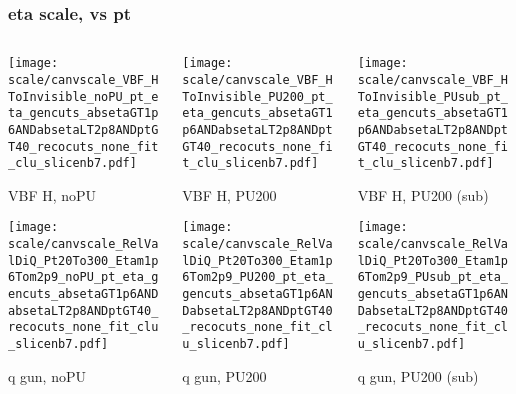 \documentclass[8pt]{beamer}
\begin{document}
  \begin{frame}
  \frametitle{eta scale, vs pt}
  
  \begin{columns}
   \begin{column}{0.35\textwidth}
     \texttt{[image: scale/canvscale\_VBF\_HToInvisible\_noPU\_pt\_eta\_gencuts\_absetaGT1p6ANDabsetaLT2p8ANDptGT40\_recocuts\_none\_fit\_clu\_slicenb7.pdf]}
     
     VBF H, noPU
    
     \texttt{[image: scale/canvscale\_RelValDiQ\_Pt20To300\_Etam1p6Tom2p9\_noPU\_pt\_eta\_gencuts\_absetaGT1p6ANDabsetaLT2p8ANDptGT40\_recocuts\_none\_fit\_clu\_slicenb7.pdf]}
     
     q gun, noPU
   \end{column}
   \begin{column}{0.35\textwidth}
     \texttt{[image: scale/canvscale\_VBF\_HToInvisible\_PU200\_pt\_eta\_gencuts\_absetaGT1p6ANDabsetaLT2p8ANDptGT40\_recocuts\_none\_fit\_clu\_slicenb7.pdf]}
     
     VBF H, PU200
    
     \texttt{[image: scale/canvscale\_RelValDiQ\_Pt20To300\_Etam1p6Tom2p9\_PU200\_pt\_eta\_gencuts\_absetaGT1p6ANDabsetaLT2p8ANDptGT40\_recocuts\_none\_fit\_clu\_slicenb7.pdf]}
     
     q gun, PU200
   \end{column}
   \begin{column}{0.35\textwidth}
     \texttt{[image: scale/canvscale\_VBF\_HToInvisible\_PUsub\_pt\_eta\_gencuts\_absetaGT1p6ANDabsetaLT2p8ANDptGT40\_recocuts\_none\_fit\_clu\_slicenb7.pdf]}
     
     VBF H, PU200 (sub)
    
     \texttt{[image: scale/canvscale\_RelValDiQ\_Pt20To300\_Etam1p6Tom2p9\_PUsub\_pt\_eta\_gencuts\_absetaGT1p6ANDabsetaLT2p8ANDptGT40\_recocuts\_none\_fit\_clu\_slicenb7.pdf]}
     
     q gun, PU200 (sub)
   \end{column}
  \end{columns}
 \end{frame}
\end{document}
